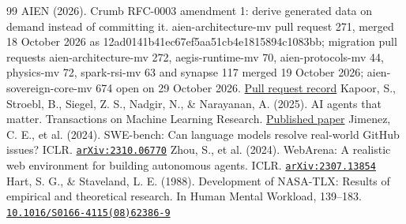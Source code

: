 \documentclass[11pt]{article}
\begin{document}
\begin{thebibliography}{99}
 AIEN (2026). Crumb RFC-0003 amendment 1: derive generated data on demand instead of committing it. aien-architecture-mv pull request 271, merged 18 October 2026 as 12ad0141b41ec67ef5aa51cb4e1815894c1083bb; migration pull requests aien-architecture-mv 272, aegis-runtime-mv 70, aien-protocols-mv 44, physics-mv 72, spark-rsi-mv 63 and synapse 117 merged 19 October 2026; aien-sovereign-core-mv 674 open on 29 October 2026. \href{https://github.com/aien-dev/aien-architecture-mv/pull/271}{Pull request record}
 Kapoor, S., Stroebl, B., Siegel, Z. S., Nadgir, N., \& Narayanan, A. (2025). AI agents that matter. Transactions on Machine Learning Research. \href{https://openreview.net/forum?id=Zy4uFzMviZ}{Published paper}
 Jimenez, C. E., et al. (2024). SWE-bench: Can language models resolve real-world GitHub issues? ICLR. \href{https://arxiv.org/abs/2310.06770}{\nolinkurl{arXiv:2310.06770}}
 Zhou, S., et al. (2024). WebArena: A realistic web environment for building autonomous agents. ICLR. \href{https://arxiv.org/abs/2307.13854}{\nolinkurl{arXiv:2307.13854}}
 Hart, S. G., \& Staveland, L. E. (1988). Development of NASA-TLX: Results of empirical and theoretical research. In Human Mental Workload, 139--183. \href{https://doi.org/10.1016/S0166-4115(08)62386-9}{\nolinkurl{10.1016/S0166-4115(08)62386-9}}
\end{thebibliography}
\end{document}

